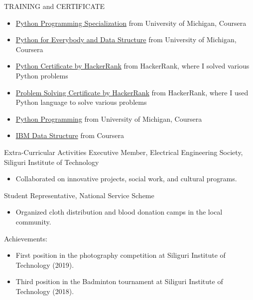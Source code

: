 \documentclass{resume} %
\begin{document}
\begin{rSection}{TRAINING and CERTIFICATE} 
\begin{itemize}
\item \href{https://drive.google.com/file/d/1S80YoSIyEC577ILkw-U3R8CC6lB_x2s1/view?usp=sharing}{Python Programming Specialization} from University of Michigan, Coursera 
\item \href{https://drive.google.com/file/d/1u-2ycUNbPSwE-oHvkoV9IxXkwhxYAgqt/view?usp=sharing}{Python for Everybody and Data Structure} from University of Michigan, Coursera 
\item\href{https://drive.google.com/file/d/1xRGpsYine5Z89apyTkO5RAcnx0lgeZuL/view?usp=sharing}{Python Certificate by HackerRank} from HackerRank, where I solved various Python problems
\item\href{https://drive.google.com/file/d/1IvGnWsXbfatwdw3qGtuJER2p9oeqYfb1/view?usp=sharing}{Problem Solving Certificate by HackerRank} from HackerRank, where I used Python language to solve various problems
\item\href{https://drive.google.com/file/d/1zim8vkHaI1QXAcOedzDCrten2WmU4wmD/view?usp=drive_link}{Python Programming} from University of Michigan, Coursera 
\item \href{https://drive.google.com/file/d/1bRp-wd0o1pFwUrInKzG33zYrfKQbtzlo/view?usp=sharing}{IBM Data Structure} from Coursera
\end{itemize}
\end{rSection}


\begin{rSection}{Extra-Curricular Activities} 
Executive Member, Electrical Engineering Society, Siliguri Institute of Technology
\begin{itemize}
    \item  Collaborated on innovative projects, social work, and cultural programs.
\end{itemize}
Student Representative, National Service Scheme
\begin{itemize}
    \item Organized cloth distribution and blood donation camps in the local community.
\end{itemize}
Achievements:
\begin{itemize}
    \item First position in the photography competition at Siliguri Institute of Technology (2019).
    \item Third position in the Badminton tournament at Siliguri Institute of Technology (2018).
\end{itemize}
\end{rSection}
\end{document}
